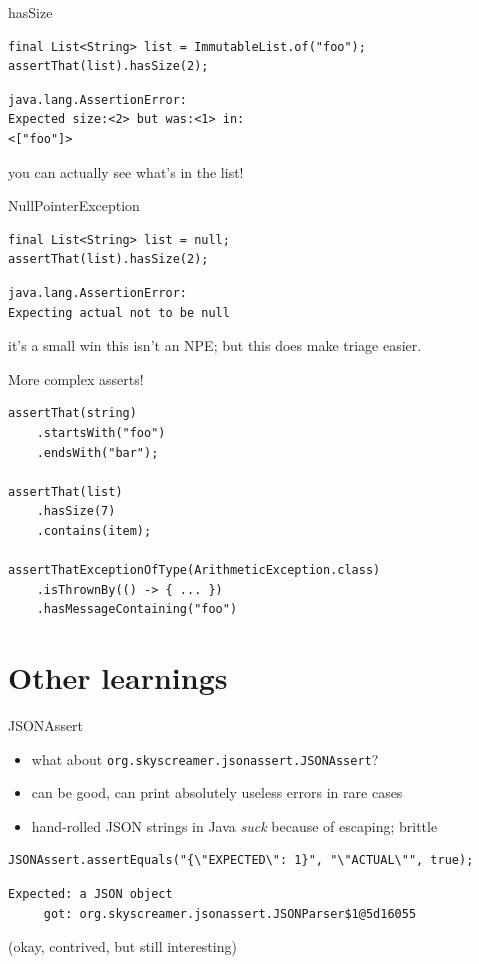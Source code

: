 \documentclass[xetex,12pt,aspectratio=169]{beamer}
\begin{document}
\begin{frame}[fragile]{hasSize}
\begin{verbatim}
final List<String> list = ImmutableList.of("foo");
assertThat(list).hasSize(2);
\end{verbatim}
\begin{verbatim}
java.lang.AssertionError:
Expected size:<2> but was:<1> in:
<["foo"]>
\end{verbatim}
\vfill
you can actually see what's in the list!
\end{frame}

\begin{frame}[fragile]{NullPointerException}
\begin{verbatim}
final List<String> list = null;
assertThat(list).hasSize(2);
\end{verbatim}
\begin{verbatim}
java.lang.AssertionError:
Expecting actual not to be null
\end{verbatim}
\vfill
it's a small win this isn't an NPE; but this does make triage easier.
\end{frame}

\begin{frame}[fragile]{More complex asserts!}
\begin{verbatim}
assertThat(string)
    .startsWith("foo")
    .endsWith("bar");

assertThat(list)
    .hasSize(7)
    .contains(item);

assertThatExceptionOfType(ArithmeticException.class)
    .isThrownBy(() -> { ... })
    .hasMessageContaining("foo")
\end{verbatim}
\end{frame}


\section{Other learnings}


\begin{frame}[fragile]{JSONAssert}
\begin{itemize}
\item what about \texttt{org.skyscreamer.jsonassert.JSONAssert}?
\item can be good, can print absolutely useless errors in rare cases
\item hand-rolled JSON strings in Java \textit{suck} because of escaping; brittle
\end{itemize}
\pause
\vfill
\begin{verbatim}
JSONAssert.assertEquals("{\"EXPECTED\": 1}", "\"ACTUAL\"", true);
\end{verbatim}
\begin{verbatim}
Expected: a JSON object
     got: org.skyscreamer.jsonassert.JSONParser$1@5d16055
\end{verbatim}
(okay, contrived, but still interesting)
\end{frame}
\end{document}
